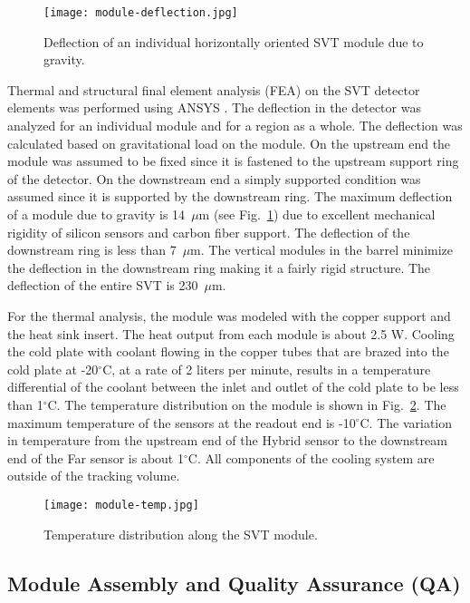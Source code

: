 \begin{figure}[hbt] 
\centering 
\texttt{[image: module-deflection.jpg]}
\caption{Deflection of an individual horizontally oriented SVT module due to gravity.}
\label{fig:module-deflection}
\end{figure}

Thermal and structural final element analysis (FEA) on the SVT detector elements was performed using ANSYS \cite{ANSYS}. The deflection in the detector was analyzed for an individual module and for a region as a whole. The deflection was calculated based on gravitational load on the module. On the upstream end the module was assumed to be fixed since it is fastened to the upstream support ring of the detector. On the downstream end a simply supported condition was assumed since it is supported by the downstream ring. The maximum deflection of a module due to gravity is 14~$\mu$m (see Fig.~\ref{fig:module-deflection}) due to excellent mechanical rigidity of silicon sensors and carbon fiber support. The deflection of the downstream ring is less than 7~$\mu$m. The vertical modules in the barrel minimize the deflection in the downstream ring making it a fairly rigid structure. The deflection of the entire SVT is 230~$\mu$m. 

For the thermal analysis, the module was modeled with the copper support and the heat sink insert. The heat output from each module is about 2.5 W. Cooling the cold plate with coolant flowing in the copper tubes that are brazed into the cold plate at -20$^\circ$C, at a rate of 2 liters per minute, results in a temperature differential of the coolant between the inlet and outlet of the cold plate to be less than 1$^\circ$C. The temperature distribution on the module is shown in Fig.~\ref{fig:module-temp}. The maximum temperature of the sensors at the readout end is -10$^\circ$C. The variation in temperature from the upstream end of the Hybrid sensor to the downstream end of the Far sensor is about 1$^\circ$C. All components of the cooling system are outside of the tracking volume.

\begin{figure}[hbt] 
\centering 
\texttt{[image: module-temp.jpg]}
\caption{Temperature distribution along the SVT module.}
\label{fig:module-temp}
\end{figure}

\subsection{Module Assembly and Quality Assurance (QA)}

